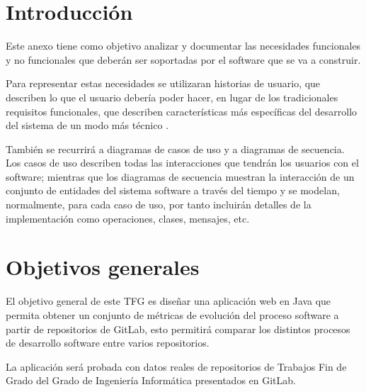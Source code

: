 \label{anex:B}

\section{Introducción}

Este anexo tiene como objetivo analizar y documentar las necesidades funcionales y no funcionales que deberán ser soportadas por el software que se va a construir.

Para representar estas necesidades se utilizaran historias de usuario, que describen lo que el usuario debería poder hacer, en lugar de los tradicionales requisitos funcionales, que describen características más específicas del desarrollo del sistema de un modo más técnico \cite{sanchez_requisitos_2016}. 

También se recurrirá a diagramas de casos de uso y a diagramas de secuencia. Los casos de uso describen todas las interacciones que tendrán los usuarios con el software; mientras que los diagramas de secuencia muestran la interacción de un conjunto de entidades del sistema software a través del tiempo y se modelan, normalmente, para cada caso de uso, por tanto incluirán detalles de la implementación como operaciones, clases, mensajes, etc.

\section{Objetivos generales}
El objetivo general de este TFG es diseñar una aplicación web en Java que permita obtener un conjunto de métricas de evolución del proceso software \cite{ratzinger_space:_2007} a partir de repositorios de GitLab, esto permitirá comparar los distintos procesos de desarrollo software entre varios repositorios.

La aplicación será probada con datos reales de repositorios de Trabajos Fin de Grado del Grado de Ingeniería Informática presentados en GitLab.

